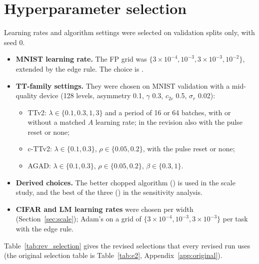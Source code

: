 \section{Hyperparameter selection}\label{app:selection}
Learning rates and algorithm settings were selected on validation splits only, with seed 0.
\begin{itemize}
\item \textbf{MNIST learning rate.} The FP grid was $\{3\times10^{-4},10^{-3},3\times10^{-3},10^{-2}\}$, extended by the edge
      rule. The choice is \RLrMnist{}.
\item \textbf{TT-family settings.} They were chosen on MNIST validation with a mid-quality device (128 levels, asymmetry 0.1,
      $\gamma$ 0.3, $c_{2c}$ 0.5, $\sigma_r$ 0.02):
      \begin{itemize}
      \item TTv2: $\lambda\in\{0.1,0.3,1,3\}$ and a period of 16 or 64 batches, with or without a matched $A$ learning rate;
            in the revision also with the pulse reset or none;
      \item c-TTv2: $\lambda\in\{0.1,0.3\}$, $\rho\in\{0.05,0.2\}$, with the pulse reset or none;
      \item AGAD: $\lambda\in\{0.1,0.3\}$, $\rho\in\{0.05,0.2\}$, $\beta\in\{0.3,1\}$.
      \end{itemize}
\item \textbf{Derived choices.} The better chopped algorithm (\RETwoBestchopped{}) is used in the scale study, and the best of
      the three (\RETwoSalgo{}) in the sensitivity analysis.
\item \textbf{CIFAR and LM learning rates} were chosen per width (Section~\ref{sec:scale}); Adam's on a grid of
      $\{3\times10^{-4},10^{-3},3\times10^{-3}\}$ per task with the edge rule.
\end{itemize}

Table~\ref{tab:rev_selection} gives the revised selections that every revised run uses (the original selection table is Table~\ref{tab:e2}, Appendix~\ref{app:original}).


